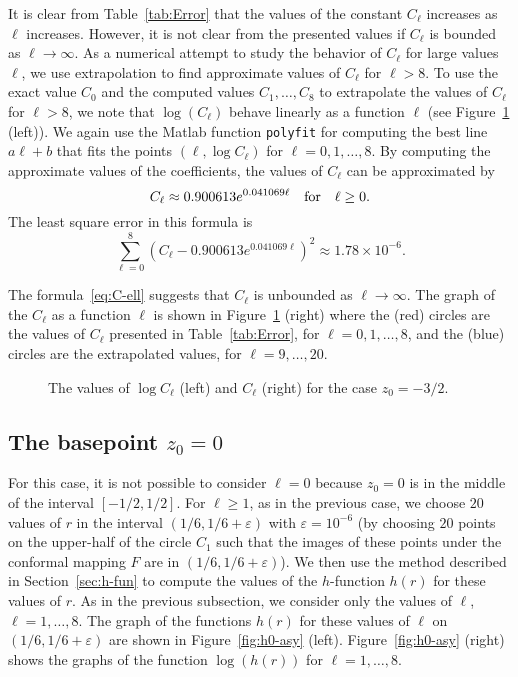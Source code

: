   
It is clear from Table~\ref{tab:Error} that the values of the constant $C_\ell$ increases as $\ell$ increases. However, it is not clear from the presented values if $C_\ell$ is bounded as $\ell\to\infty$. As a numerical attempt to study the behavior of $C_\ell$ for large values $\ell$, we use extrapolation to find approximate values of $C_\ell$ for $\ell>8$. 
To use the exact value $C_0$ and the computed values $C_1,\ldots,C_8$ to extrapolate the values of $C_\ell$ for $\ell>8$, we note that $\log(C_\ell)$ behave linearly as a function $\ell$ (see Figure~\ref{fig:C08} (left)).   
We again use the {\sc Matlab} function \verb|polyfit| for computing the best line $a\ell+b$ that fits the points $(\ell,\log C_\ell)$ for $\ell=0,1,\ldots,8$. By computing the approximate values of the coefficients, the values of $C_\ell$ can be approximated by
\begin{equation}\label{eq:C-ell}
C_\ell \approx 0.900613 e^{0.041069\ell}\quad {\rm for}\quad \ell\ge 0.
\end{equation}
The least square error in this formula is
\[
\sum_{\ell=0}^{8} \left(C_\ell - 0.900613 e^{0.041069\ell}\right)^2\approx 1.78\times10^{-6}.
\]

The formula~\eqref{eq:C-ell} suggests that $C_\ell$ is unbounded as $\ell\to\infty$. 
The graph of the $C_\ell$ as a function $\ell$ is shown in Figure~\ref{fig:C08} (right) where the (red) circles are the values of $C_\ell$ presented in Table~\ref{tab:Error}, for $\ell=0,1,\ldots,8$, and the (blue) circles are the extrapolated values, for $\ell=9,\ldots,20$. 

\begin{figure}[htb] %
	\centerline{
		\hfill
	}
	\caption{The values of $\log C_\ell$ (left) and $C_\ell$ (right) for the case $z_0=-3/2$.}
	\label{fig:C08}
\end{figure}



\subsection{The basepoint $z_0=0$}

For this case, it is not possible to consider $\ell=0$ because $z_0=0$ is in the middle of the interval $[-1/2,1/2]$. For $\ell\ge1$, as in the previous case, we choose $20$ values of $r$ in the interval $(1/6,1/6+\varepsilon)$ with $\varepsilon=10^{-6}$ (by choosing $20$ points on the upper-half of the circle $C_1$ such that the images of these points under the conformal mapping $F$ are in  $(1/6,1/6+\varepsilon)$). We then use the method described in Section~\ref{sec:h-fun} to compute the values of the $h$-function $h(r)$ for these values of $r$. 
As in the previous subsection, we consider only the values of $\ell$, $\ell=1,\ldots,8$. The graph of the functions $h(r)$ for these values of $\ell$ on $(1/6,1/6+\varepsilon)$ are shown in Figure~\ref{fig:h0-asy} (left). 
Figure~\ref{fig:h0-asy} (right) shows the graphs of the function $\log(h(r))$ for $\ell=1,\ldots,8$.

